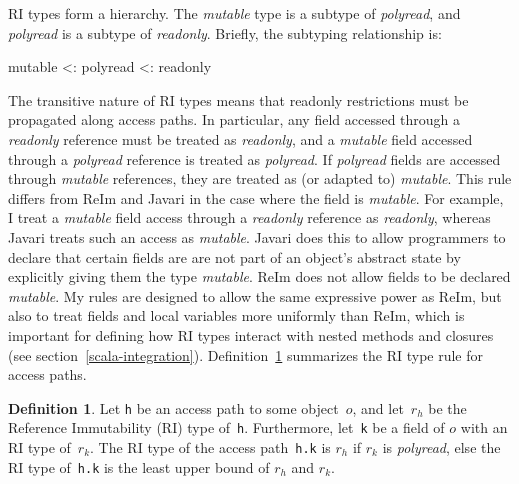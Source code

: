 \documentclass[letterpaper,11pt]{article}
\newcommand{\code}[1]{\lstinline$#1$}
\theoremstyle{definition}
\newtheorem{definition}{Definition}[section]
\theoremstyle{remark}
\begin{document}
RI types form a hierarchy.
The \emph{mutable} type is a subtype of \emph{polyread},
and \emph{polyread} is a subtype of \emph{readonly}.
Briefly, the subtyping relationship is:

\begin{center}
	mutable <: polyread <: readonly
\end{center}

The transitive nature of RI types means that readonly restrictions must be
propagated along access paths.
In particular, any field accessed through a \emph{readonly} reference must
be treated as \emph{readonly}, and a \emph{mutable} field accessed through
a \emph{polyread} reference is treated as \emph{polyread}.
If \emph{polyread} fields are accessed through \emph{mutable} references,
they are treated as (or adapted to) \emph{mutable}.
This rule differs from ReIm and Javari in the case where the field is \emph{mutable}.
For example, I treat a \emph{mutable} field access through a \emph{readonly}
reference as \emph{readonly}, whereas Javari treats such an access as \emph{mutable}.
Javari does this to allow programmers to declare that certain fields are are not
part of an object's abstract state by explicitly giving them the type \emph{mutable}.
ReIm does not allow fields to be declared \emph{mutable}.
My rules are designed to allow the same expressive power as ReIm, but also to
treat fields and local variables more uniformly than ReIm, which is important for defining
how RI types interact with nested methods and closures (see section~\ref{scala-integration}).
Definition~\ref{accesspath-ri-def} summarizes the RI type rule for access paths.


\begin{definition}
	\label{accesspath-ri-def}
	Let \code{h} be an access path to some object~$o$, and let~$r_h$
	be the Reference Immutability (RI) type of~\code{h}.
	Furthermore, let~\code{k} be a field of $o$ with an RI type of~$r_k$.
	The RI type of the access path~\code{h.k}
	is $r_h$ if $r_k$
	is \emph{polyread}, else the RI type of~\code{h.k} is
	the least upper bound of $r_h$ and $r_k$.
\end{definition}
\end{document}
